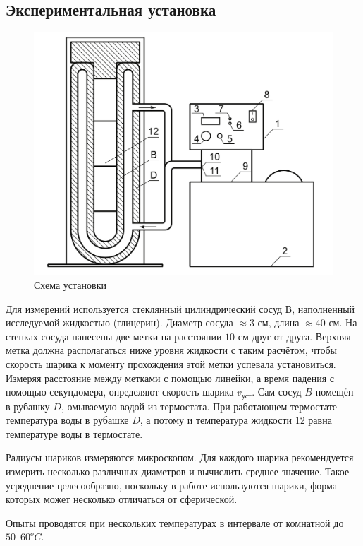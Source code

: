\documentclass[12pt,a4paper]{article}
\begin{document}
\subsection*{Экспериментальная установка}
\begin{figure}
    \centering
    \includegraphics[scale = 0.2]{scheme.png}
    \caption{Схема установки}    
\end{figure}
Для измерений используется стеклянный цилиндрический сосуд $В$, наполненный исследуемой жидкостью (глицерин). 
Диаметр сосуда $\approx 3$ см, длина $\approx 40$ см. 
На стенках сосуда нанесены две метки на расстоянии $10$ см друг от друга. 
Верхняя метка должна располагаться ниже уровня жидкости с таким расчётом, чтобы скорость шарика к моменту прохождения этой метки успевала установиться. 
Измеряя расстояние между метками с помощью линейки, а время падения с помощью секундомера, определяют скорость шарика $v_{уст}$. 
Сам сосуд $B$ помещён в рубашку $D$, омываемую водой из термостата. 
При работающем термостате температура воды в рубашке $D$, а потому и температура жидкости 12 равна температуре воды в термостате.

Радиусы шариков измеряются микроскопом. 
Для каждого шарика рекомендуется измерить несколько различных диаметров и вычислить среднее значение. 
Такое усреднение целесообразно, поскольку в работе используются шарики, форма которых может несколько отличаться от сферической. 

Опыты проводятся при нескольких температурах в интервале от комнатной до $50–60 ^oC$.
\end{document}

